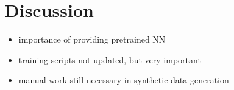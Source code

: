 \documentclass[conference]{IEEEtran}
\begin{document}
\section{Discussion}
\begin{itemize}
    \item importance of providing pretrained NN
    
    \item training scripts not updated, but very important

    \item manual work still necessary in synthetic data generation
\end{itemize}




\end{document}
